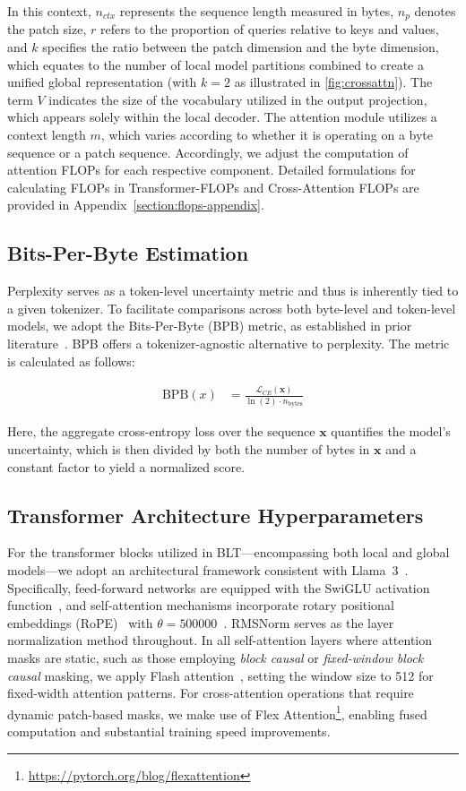In this context, $n_{ctx}$ represents the sequence length measured in bytes, $n_p$ denotes the patch size, $r$ refers to the proportion of queries relative to keys and values, and $k$ specifies the ratio between the patch dimension and the byte dimension, which equates to the number of local model partitions combined to create a unified global representation (with $k=2$ as illustrated in \autoref{fig:crossattn}). The term $V$ indicates the size of the vocabulary utilized in the output projection, which appears solely within the local decoder. The attention module utilizes a context length $m$, which varies according to whether it is operating on a byte sequence or a patch sequence. Accordingly, we adjust the computation of attention FLOPs for each respective component. Detailed formulations for calculating FLOPs in Transformer-FLOPs and Cross-Attention FLOPs are provided in Appendix~\ref{section:flops-appendix}.

\subsection{Bits-Per-Byte Estimation} Perplexity serves as a token-level uncertainty metric and thus is inherently tied to a given tokenizer. To facilitate comparisons across both byte-level and token-level models, we adopt the Bits-Per-Byte (BPB) metric, as established in prior literature~\citep{xue2022byt5, yu2023megabyte, wang2024mambabyte}. BPB offers a tokenizer-agnostic alternative to perplexity. The metric is calculated as follows:

\begin{align}
    \text{BPB}(x)&= \frac{\mathcal{L}_{CE}(\pmb{x})}{\ln(2)\cdot n_{\text{bytes}}}
\end{align}

Here, the aggregate cross-entropy loss over the sequence $\pmb{x}$ quantifies the model's uncertainty, which is then divided by both the number of bytes in $\pmb{x}$ and a constant factor to yield a normalized score.

\subsection{Transformer Architecture Hyperparameters} For the transformer blocks utilized in {\textsc BLT}—encompassing both local and global models—we adopt an architectural framework consistent with Llama~3~\citep{dubey2024llama}. Specifically, feed-forward networks are equipped with the SwiGLU activation function~\citep{swiglu}, and self-attention mechanisms incorporate rotary positional embeddings (RoPE)~\citep{RoPe} with $\theta=500000$~\citep{xiong2024effective}. RMSNorm \citep{RMSNorm} serves as the layer normalization method throughout. In all self-attention layers where attention masks are static, such as those employing \textit{block causal} or \textit{fixed-window block causal} masking, we apply Flash attention~\citep{dao2022flashattention}, setting the window size to 512 for fixed-width attention patterns. For cross-attention operations that require dynamic patch-based masks, we make use of Flex Attention\footnote{\url{https://pytorch.org/blog/flexattention}}, enabling fused computation and substantial training speed improvements.

